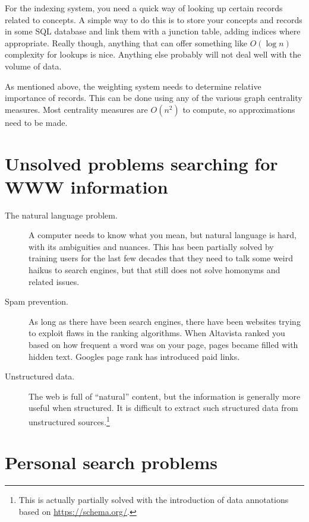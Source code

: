 \documentclass[12pt,a4paper]{article}
\begin{document}
For the indexing system, you need a quick way of looking up certain records related to concepts. A simple way to do this is to store your concepts and records in some SQL database and link them with a junction table, adding indices where appropriate. Really though, anything that can offer something like $O (\log n)$ complexity for lookups is nice. Anything else probably will not deal well with the volume of data.

As mentioned above, the weighting system needs to determine relative importance of records. This can be done using any of the various graph centrality measures. Most centrality measures are $O(n^2)$ to compute, so approximations need to be made.

\section{Unsolved problems searching for WWW information}

\begin{description}
\item[The natural language problem.] A computer needs to know what you mean, but natural language is hard, with its ambiguities and nuances. This has been partially solved by training users for the last few decades that they need to talk some weird haikus to search engines, but that still does not solve homonyms and related issues.

\item[Spam prevention.] As long as there have been search engines, there have been websites trying to exploit flaws in the ranking algorithms. When Altavista ranked you based on how frequent a word was on your page, pages became filled with hidden text. Googles page rank has introduced paid links.

\item[Unstructured data.] The web is full of ``natural'' content, but the information is generally more useful when structured. It is difficult to extract such structured data from unstructured sources.\footnote{This is actually partially solved with the introduction of data annotations based on \url{https://schema.org/}.}
\end{description}

\section{Personal search problems}
\end{document}
